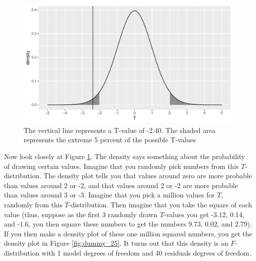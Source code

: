 \documentclass[]{report}\usepackage[]{graphicx}\usepackage[]{color}
\makeatletter
\def\maxwidth{ %
  \ifdim\Gin@nat@width>\linewidth
    \linewidth
  \else
    \Gin@nat@width
  \fi
}
\newenvironment{knitrout}{}{} %
\makeatother
\begin{document}
\begin{knitrout}
\color{fgcolor}\begin{figure}

{\centering \includegraphics[width=\maxwidth]{figure/dummy_24-1} 

}

\caption[The vertical line represents a T-value of -2.40]{The vertical line represents a T-value of -2.40. The shaded area represents the extreme 5 percent of the possible T-values}\label{fig:dummy_24}
\end{figure}


\end{knitrout}


Now look closely at Figure \ref{fig:dummy_24}. The density says something about the probability of drawing certain values. Imagine that you randomly pick numbers from this $T$-distribution. The density plot tells you that values around zero are more probable than values around 2 or -2, and that values around 2 or -2 are more probable than values around 3 or -3. Imagine that you pick a million values for $T$, randomly from this $T$-distribution. Then imagine that you take the square of each value (thus, suppose as the first 3 randomly drawn $T$-values you get -3.12, 0.14, and -1.6, you then square these numbers to get the numbers 9.73, 0.02, and 2.79). If you then make a density plot of these one million squared numbers, you get the density plot in Figure \ref{fig:dummy_25}. It turns out that this density is an $F$-distribution with 1 model degrees of freedom and 40 residuals degrees of freedom. 
\end{document}
